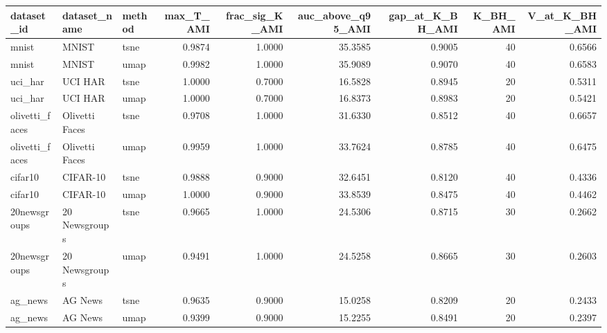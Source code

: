 \begin{tabular}{lllrrrrrr}
\toprule
dataset_id & dataset_name & method & max_T_AMI & frac_sig_K_AMI & auc_above_q95_AMI & gap_at_K_BH_AMI & K_BH_AMI & V_at_K_BH_AMI \\
\midrule
mnist & MNIST & tsne & 0.9874 & 1.0000 & 35.3585 & 0.9005 & 40 & 0.6566 \\
mnist & MNIST & umap & 0.9982 & 1.0000 & 35.9089 & 0.9070 & 40 & 0.6583 \\
uci_har & UCI HAR & tsne & 1.0000 & 0.7000 & 16.5828 & 0.8945 & 20 & 0.5311 \\
uci_har & UCI HAR & umap & 1.0000 & 0.7000 & 16.8373 & 0.8983 & 20 & 0.5421 \\
olivetti_faces & Olivetti Faces & tsne & 0.9708 & 1.0000 & 31.6330 & 0.8512 & 40 & 0.6657 \\
olivetti_faces & Olivetti Faces & umap & 0.9959 & 1.0000 & 33.7624 & 0.8785 & 40 & 0.6475 \\
cifar10 & CIFAR-10 & tsne & 0.9888 & 0.9000 & 32.6451 & 0.8120 & 40 & 0.4336 \\
cifar10 & CIFAR-10 & umap & 1.0000 & 0.9000 & 33.8539 & 0.8475 & 40 & 0.4462 \\
20newsgroups & 20 Newsgroups & tsne & 0.9665 & 1.0000 & 24.5306 & 0.8715 & 30 & 0.2662 \\
20newsgroups & 20 Newsgroups & umap & 0.9491 & 1.0000 & 24.5258 & 0.8665 & 30 & 0.2603 \\
ag_news & AG News & tsne & 0.9635 & 0.9000 & 15.0258 & 0.8209 & 20 & 0.2433 \\
ag_news & AG News & umap & 0.9399 & 0.9000 & 15.2255 & 0.8491 & 20 & 0.2397 \\
\bottomrule
\end{tabular}
